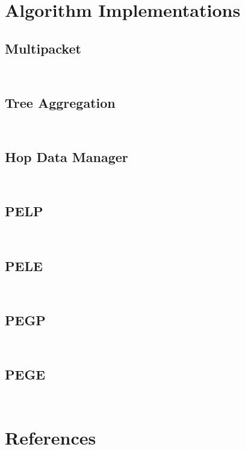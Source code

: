 \documentclass[a4paper,notitlepage]{article}
\newcommand{\sourcecode}[3]{%
\inputminted[linenos=true,tabsize=4,fontsize=\small,frame=lines,framesep=2mm]{c}{#1/#2}
\inputminted[linenos=true,tabsize=4,fontsize=\small,frame=lines,framesep=2mm]{c}{#1/#3}
}
\begin{document}

\clearpage


\appendixpage
\addappheadtotoc
\appendix



\newpage

\section{Algorithm Implementations}

\subsection{Multipacket}
\sourcecode{../Algorithms/Common/net}{multipacket.h}{multipacket.c}

\subsection{Tree Aggregation}
\sourcecode{../Algorithms/Common/net}{tree-aggregator.h}{tree-aggregator.c}

\subsection{Hop Data Manager}
\sourcecode{../Algorithms/PredEval}{hop-data-manager.h}{hop-data-manager.c}

\subsection{PELP}
\sourcecode{../Algorithms/PredEvalLocalPeriodic}{pelp.h}{pelp.c}

\subsection{PELE}
\sourcecode{../Algorithms/PredEvalLocalEvent}{pele.h}{pele.c}

\subsection{PEGP}
\sourcecode{../Algorithms/PredEvalGlobalPeriodic}{pegp.h}{pegp.c}

\subsection{PEGE}
\sourcecode{../Algorithms/PredEvalGlobalEvent}{pege.h}{pege.c}


\newpage


\section{References}
\renewcommand{\refname}{\vspace{-1cm}}


\end{document}
